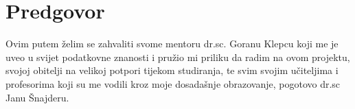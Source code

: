 \chapter*{Predgovor}
Ovim putem želim se zahvaliti svome mentoru dr.sc. Goranu Klepcu koji me je uveo u svijet podatkovne znanosti i pružio mi priliku da radim na ovom projektu, svojoj obitelji na velikoj potpori tijekom studiranja, te svim svojim učiteljima i profesorima koji su me vodili kroz moje dosadašnje obrazovanje, pogotovo dr.sc Janu Šnajderu.